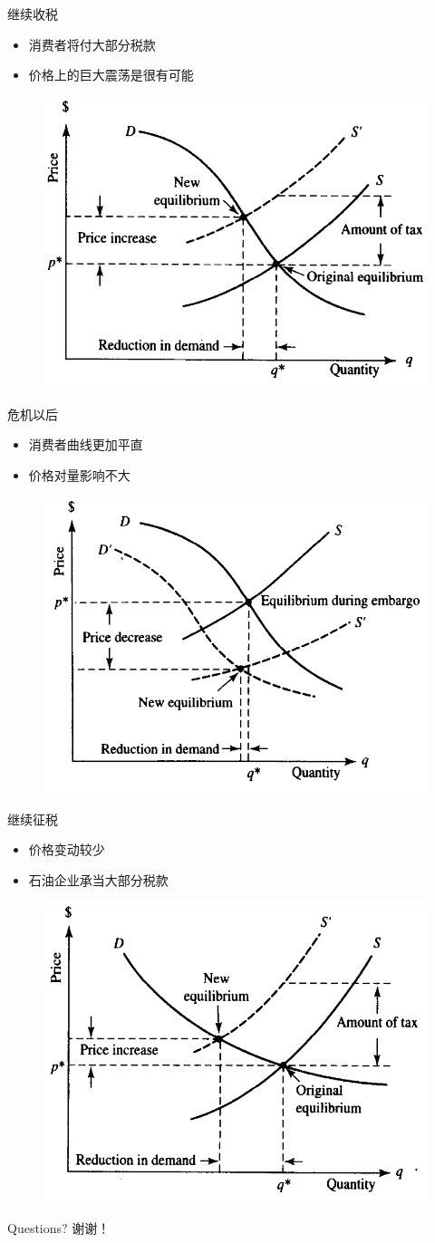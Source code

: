 \documentclass[mathserif, table]{beamer}
\begin{document}
\begin{frame}{继续收税}
  \begin{itemize}
  \item 消费者将付大部分税款
  \item 价格上的巨大震荡是很有可能
  \end{itemize}

  \begin{figure}
    \centering
    \includegraphics[width=.5\textwidth]{poor.png}
  \end{figure}
  
\end{frame}

\begin{frame}{危机以后}
  \begin{itemize}
  \item 消费者曲线更加平直
  \item 价格对量影响不大
  \end{itemize}

  \begin{figure}
    \centering
    \includegraphics[width=.5\textwidth]{ac.png}
  \end{figure}
  
\end{frame}

\begin{frame}{继续征税}
  \begin{itemize}
  \item 价格变动较少
  \item 石油企业承当大部分税款
  \end{itemize}

  \begin{figure}
    \centering
    \includegraphics[width=.5\textwidth]{crazy.png}
  \end{figure}

\end{frame}

\begin{frame}
  Questions?
  谢谢！
\end{frame}
\end{document}
